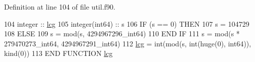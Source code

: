 Definition at line 104 of file util.\+f90.


\begin{DoxyCode}
104       \textcolor{keywordtype}{integer} :: \hyperlink{util_8f90_a669ac8da4cdd11efd16a0ef72a4f7915}{lcg}
105       \textcolor{keywordtype}{integer(int64)} :: s
106       \textcolor{keywordflow}{IF} (s == 0) \textcolor{keywordflow}{THEN}
107          s = 104729
108       \textcolor{keywordflow}{ELSE}
109          s = mod(s, 4294967296\_int64)
110 \textcolor{keywordflow}{      END IF}
111       s = mod(s * 279470273\_int64, 4294967291\_int64)
112       \hyperlink{util_8f90_a669ac8da4cdd11efd16a0ef72a4f7915}{lcg} = int(mod(s, int(huge(0), int64)), kind(0))
113 \textcolor{keyword}{    END FUNCTION }\hyperlink{util_8f90_a669ac8da4cdd11efd16a0ef72a4f7915}{lcg}
\end{DoxyCode}
